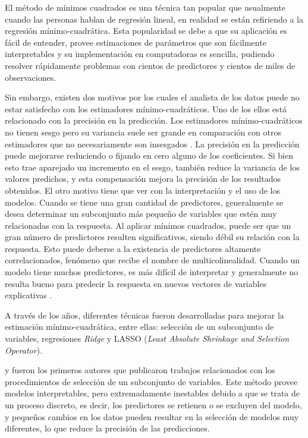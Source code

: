 \documentclass[a4paper,12pt]{report}
\begin{document}
El método de mínimos cuadrados es una técnica tan popular que usualmente cuando las personas hablan de regresión lineal, en realidad se están refiriendo a la regresión mínimo-cuadrática. Esta popularidad se debe a que su aplicación es fácil de entender, provee estimaciones de parámetros que son fácilmente interpretables y su implementación en computadoras es sencilla, pudiendo resolver rápidamente problemas con cientos de predictores y cientos de miles de observaciones.

Sin embargo, existen dos motivos por los cuales el analista de los datos puede no estar satisfecho con los estimadores mínimo-cuadráticos. Uno de los ellos está relacionado con la precisión en la predicción. Los estimadores mínimo-cuadráticos no tienen sesgo pero su variancia suele ser grande en comparación con otros estimadores que no necesariamente son insesgados \citep{tibshirani1996regression}. La precisión en la predicción puede mejorarse reduciendo o fijando en cero alguno de los coeficientes. Si bien esto trae aparejado un incremento en el sesgo, también reduce la variancia de los valores predichos, y esta compensación mejora la precisión de los resultados obtenidos. El otro motivo tiene que ver con la interpretación y el uso de los modelos. Cuando se tiene una gran cantidad de predictores, generalmente se desea determinar un subconjunto más pequeño de variables que estén muy relacionadas con la respuesta. Al aplicar mínimos cuadrados, puede ser que un gran número de predictores resulten significativos, siendo débil su relación con la respuesta. Esto puede deberse a la existencia de predictores altamente correlacionados, fenómeno que recibe el nombre de multicolinealidad. Cuando un modelo tiene muchos predictores, es más difícil de interpretar y generalmente no resulta bueno para predecir la respuesta en nuevos vectores de variables explicativas \citep{friedman2001elements}.

A través de los años, diferentes técnicas fueron desarrolladas para mejorar la estimación mínimo-cuadrática, entre ellas: selección de un subconjunto de variables, regresiones \textit{Ridge} y LASSO (\textit{Least Absolute Shrinkage and Selection Operator}).

\citet{beale1967discarding} y \citet{hocking1967selection} fueron los primeros autores que publicaron trabajos relacionados con los procedimientos de selección de un subconjunto de variables. Este método provee modelos interpretables, pero extremadamente inestables debido a que se trata de un proceso discreto, es decir, los predictores se retienen o se excluyen del modelo, y pequeños cambios en los datos pueden resultar en la selección de modelos muy diferentes, lo que reduce la precisión de las predicciones.
\end{document}
